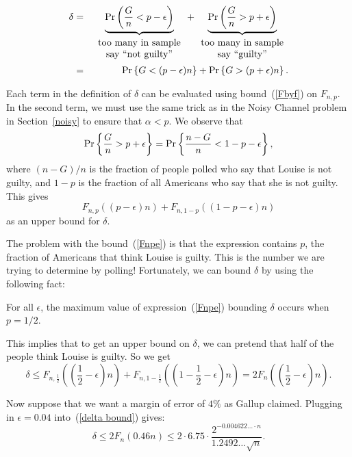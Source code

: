 \documentclass[11pt,twoside]{article}
\begin{document}
\begin{eqnarray*}
\delta  & = &
        \underbrace{\Pr\left(\frac{G}{n} < p - \epsilon\right)}_{
\begin{array}{c}
\mbox{too many in sample} \\
\mbox{say ``not guilty''}
\end{array}}
        + \underbrace{\Pr\left(\frac{G}{n} > p + \epsilon\right)}_{
\begin{array}{c}
\mbox{too many in sample} \\
\mbox{say ``guilty''}
\end{array}} \\
        & = & \mathop{\textup{Pr}}\nolimits\left\{G < (p - \epsilon) n\right\} + \mathop{\textup{Pr}}\nolimits\left\{G > (p + \epsilon) n\right\}.
\end{eqnarray*}

Each term in the definition of $\delta$ can be evaluated using
bound~(\ref{Fbyf}) on $F_{n,p}$.  In the second term, we must use the same
trick as in the Noisy Channel problem in Section~\ref{noisy} to
ensure that $\alpha < p$.  We observe that
\[
\mathop{\textup{Pr}}\nolimits\left\{\frac{G}{n} > p + \epsilon\right\} = \mathop{\textup{Pr}}\nolimits\left\{\frac{n - G}{n} < 1 -p - \epsilon\right\},
\]
where $(n - G)/n$ is the fraction of people polled who say that
Louise is not guilty, and $1-p$ is the fraction of all Americans who say
that she is not guilty.  This gives
\begin{equation}\label{Fnpe}
F_{n,p}((p - \epsilon) n) + F_{n,1-p}((1-p-\epsilon) n)
\end{equation}
as an upper bound for $\delta$.

The problem with the bound~(\ref{Fnpe}) is that the expression contains
$p$, the fraction of Americans that think Louise is guilty.  This is the
number we are trying to determine by polling!  Fortunately, we can bound
$\delta$ by using the following fact:
\begin{fact}
For all $\epsilon$, the maximum value of expression~(\ref{Fnpe}) bounding
$\delta$ occurs when $p = 1/2$.
\end{fact}

This implies that to get an upper bound on $\delta$, we can pretend that
half of the people think Louise is guilty.  So we get
\begin{equation}\label{delta bound}
\delta \leq F_{n,\frac{1}{2}}((\frac{1}{2} - \epsilon) n) +
   F_{n,1-\frac{1}{2}}((1-\frac{1}{2}-\epsilon) n)
 = 2 F_{n}((\frac{1}{2} - \epsilon) n).
\end{equation}

Now suppose that we want a margin of error of $4\%$ as Gallup claimed.
Plugging in $\epsilon = 0.04$ into~(\ref{delta bound}) gives:
\begin{equation*}
\delta \leq   2 F_{n}(0.46 n)
 \leq 
2 \cdot 6.75 \cdot \frac{2^{-0.004622\ldots \cdot n}}{1.2492\ldots \sqrt{n}}.
\end{equation*}
\end{document}
